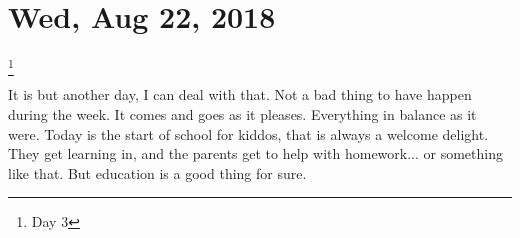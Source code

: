 \section{Wed, Aug 22, 2018}\footnote{Day 3}

It is but another day, I can deal with that. Not a bad thing to have happen during
the week. It comes and goes as it pleases. Everything in balance as it were. Today is
the start of school for kiddos, that is always a welcome delight. They get learning
in, and the parents get to help with homework... or something like that. But
education is a good thing for sure.
